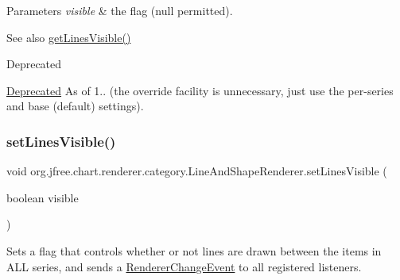 \begin{DoxyParams}{Parameters}
{\em visible} & the flag ({\ttfamily null} permitted).\\
\hline
\end{DoxyParams}
\begin{DoxySeeAlso}{See also}
\mbox{\hyperlink{classorg_1_1jfree_1_1chart_1_1renderer_1_1category_1_1_line_and_shape_renderer_aae2830cd3d5576be04342cb538b08c4c}{get\+Lines\+Visible()}}
\end{DoxySeeAlso}
\begin{DoxyRefDesc}{Deprecated}
\item[\mbox{\hyperlink{deprecated__deprecated000187}{Deprecated}}]As of 1.. (the override facility is unnecessary, just use the per-\/series and base (default) settings). \end{DoxyRefDesc}
\mbox{\label{classorg_1_1jfree_1_1chart_1_1renderer_1_1category_1_1_line_and_shape_renderer_a394a9bf0733275d47990797ff00835c3}} 
\subsubsection{\texorpdfstring{set\+Lines\+Visible()}{setLinesVisible()}\hspace{0.1cm}{\footnotesize\ttfamily [2/2]}}
{\footnotesize\ttfamily void org.\+jfree.\+chart.\+renderer.\+category.\+Line\+And\+Shape\+Renderer.\+set\+Lines\+Visible (\begin{DoxyParamCaption}\item[{boolean}]{visible }\end{DoxyParamCaption})}

Sets a flag that controls whether or not lines are drawn between the items in A\+LL series, and sends a \mbox{\hyperlink{}{Renderer\+Change\+Event}} to all registered listeners.


